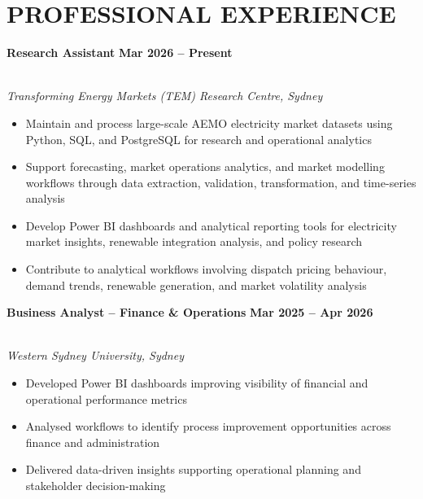 \documentclass[10pt,a4paper]{article}
\begin{document}
\vspace{6pt}


\section{PROFESSIONAL EXPERIENCE}

\textbf{\color{Secondary} Research Assistant}
\hfill
{\color{Primary}\textbf{Mar 2026 -- Present}}

\\
\textit{Transforming Energy Markets (TEM) Research Centre, Sydney}

\vspace{3pt}

\begin{itemize}
\item Maintain and process large-scale AEMO electricity market datasets using Python, SQL, and PostgreSQL for research and operational analytics
\item Support forecasting, market operations analytics, and market modelling workflows through data extraction, validation, transformation, and time-series analysis
\item Develop Power BI dashboards and analytical reporting tools for electricity market insights, renewable integration analysis, and policy research
\item Contribute to analytical workflows involving dispatch pricing behaviour, demand trends, renewable generation, and market volatility analysis
\end{itemize}

\vspace{6pt}

\textbf{\color{Secondary} Business Analyst -- Finance \& Operations}
\hfill
{\color{Primary}\textbf{Mar 2025 -- Apr 2026}}

\\
\textit{Western Sydney University, Sydney}

\vspace{3pt}

\begin{itemize}
\item Developed Power BI dashboards improving visibility of financial and operational performance metrics
\item Analysed workflows to identify process improvement opportunities across finance and administration
\item Delivered data-driven insights supporting operational planning and stakeholder decision-making
\end{itemize}
\end{document}
